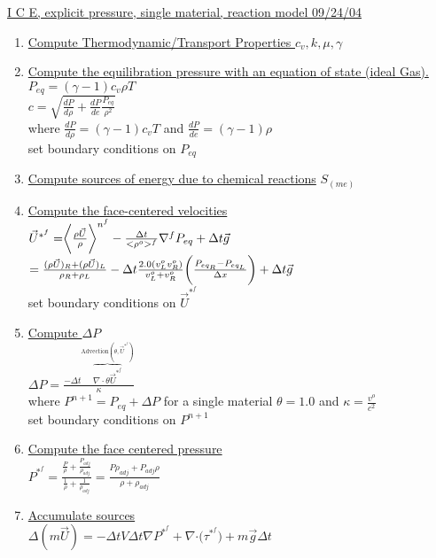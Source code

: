 \documentclass[fleqn]{article}
\newcommand{\bigS}[1]   {\ensuremath{S_{#1}}  }
\newcommand{\B}[1]      {\biggr{#1}}
\newcommand{\U}         {{\vec{U}}}
\newcommand{\rhoM}      {\ensuremath{\rho^{o}}}
\newcommand{\delt}      {\ensuremath{\Delta{t}} }
\newcommand{\sv}[1]     {\ensuremath{v^o_{{#1}} }}
\begin{document}
\setlength{\abovedisplayskip}{0.1in}
\setlength{\mathindent}{0.0in}
\underline{ I C E, explicit pressure, single material, reaction model  \hspace{ 0.5in}09/24/04}

\begin{enumerate}
\item \underline{Compute Thermodynamic/Transport Properties
$c_v, k, \mu, \gamma$}
\item \underline{Compute the equilibration pressure with an equation of state (ideal Gas).}\\
$P_{eq} = (\gamma -1) c_v \rho T$\\
$c = \sqrt{ \frac{dP}{d\rho} + \frac{dP}{de} \frac{P_{eq}}{\rho^2} }$\\
where
$\frac{dP}{d\rho} = (\gamma -1) c_v T$ and 
$\frac{dP}{de} = (\gamma - 1) \rho$ \\
set boundary conditions on $P_{eq}$
\item \underline{Compute sources of energy due to chemical reactions} 
$\bigS{(m e)}$
\item \underline{Compute the face-centered velocities}\\
  $ \vec{U}^{*^{f}} 
    = \B{<} \frac{ \rho \U }{\rho} \B{>}^{n^{f}}
    - \frac{ \delt }{< \rhoM >^f} \nabla^{f} P_{eq}
     + \delt\vec{g} $ \\
$    
   =\frac{(\rho \U)_{R} + (\rho \U)_{L}}{\rho_{R} + \rho_{L}}
   -\delt \frac{2.0 (\sv{L} \sv{R})}  {\sv{L} + \sv{R}}  \B{(} \frac{P_{eq_R} - P_{eq_L}}{\Delta x}\B{)}
   + \delt\vec{g} $ \\
set boundary conditions on $\vec{U}^{*^{f}}$
%
\item \underline{Compute $\Delta P$}  \\
$     \Delta P =  
              \frac{  - \Delta{t} \overbrace{ \nabla \cdot \theta \vec{U}^{*^{f}} } ^{\text{Advection}(\theta, \vec{U}^{*^{f}}) } }
              {\kappa} $\\
where $P^{n+1} = P_{eq} + \Delta{P}$ for a single material $\theta = 1.0$ and $\kappa = \frac{v^o}{c^2}$ \\
set boundary conditions on $P^{n+1}$
%
\item \underline{Compute the face centered pressure}\\
$ P^{*^{f}} = \frac{\frac{P}{\rho} + \frac{P_{adj}}{\rho_{adj}}}
                     {\frac{1}{\rho} + \frac{1}{\rho_{adj}}}
              =\frac{ {P \rho_{adj}} + {P_{adj} \rho }  }
                 { {\rho} + {\rho_{adj}  }  } $
%
\item \underline{Accumulate sources}\\  
 $\Delta(m\vec{U}) = 
    - \delt V \delt \nabla{ P^{*^f}} 
    + \nabla{ \cdot (\tau^{*^f}})
    + m \vec{g}\delt$
    

\end{enumerate}
\end{document}
